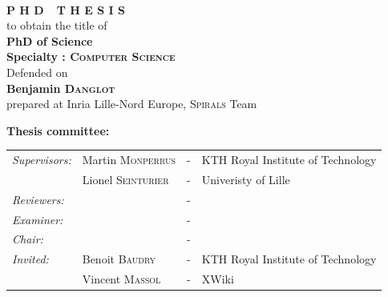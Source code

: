\begin{titlepage}
\begin{center}
\vspace*{0.9cm}
 \\
\vspace*{0.9cm}
\vspace*{0.5cm}
\noindent \Huge \textbf{P H D\ \ T H E S I S} \\
\vspace*{0.3cm}
\noindent \large {to obtain the title of} \\
\vspace*{0.3cm}
\noindent \LARGE \textbf{PhD of Science} \\
\vspace*{0.3cm}
\noindent \Large \textbf{Specialty : \textsc{Computer Science}}\\
\vspace*{0.4cm}
\noindent \large {Defended on \\}
\noindent \LARGE \textbf{Benjamin \textsc{Danglot}} \\
\vspace*{0.9cm}
\noindent \Large prepared at Inria Lille-Nord Europe, \textsc{Spirals} Team\\
\vspace*{0.5cm}
\end{center}
\noindent \large \textbf{Thesis committee:} \\
\begin{center}
\noindent \large 
\begin{tabular}{llcl}
      \textit{Supervisors:}	& Martin \textsc{Monperrus}	& - & KTH Royal Institute of Technology \\
      & Lionel \textsc{Seinturier}	& - & Univeristy of Lille \\
      \textit{Reviewers:} &  & - & \\
      \textit{Examiner:} &  & - & \\
      \textit{Chair:} &  & - & \\
      \textit{Invited:}	& Benoit \textsc{Baudry} & - &  KTH Royal Institute of Technology\\
      & Vincent \textsc{Massol} & - &  XWiki
\end{tabular}
\end{center}
\end{titlepage}
\sloppy

\titlepage

